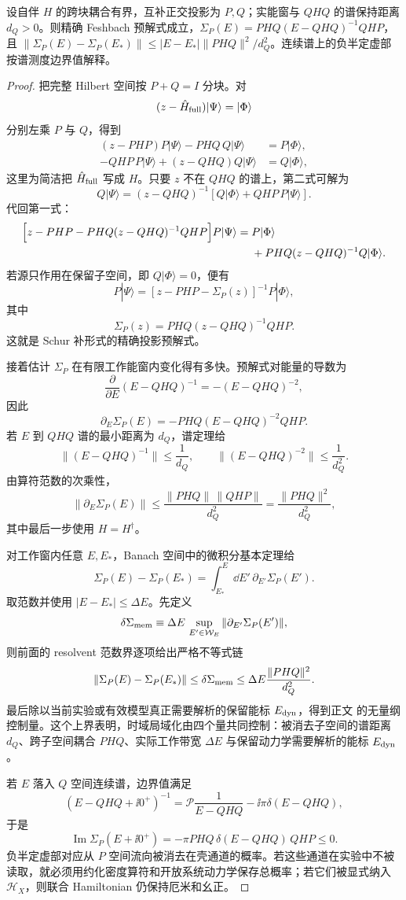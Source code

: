 \begin{theorem}[投影自能的谱隙变化界]
设自伴 $H$ 的跨块耦合有界，互补正交投影为 $P,Q$；实能窗与 $QHQ$ 的谱保持距离 $d_Q>0$。则精确 Feshbach 预解式成立，$\Sigma_P(E)=PHQ(E-QHQ)^{-1}QHP$，且 $\|\Sigma_P(E)-\Sigma_P(E_*)\|\le |E-E_*|\|PHQ\|^2/d_Q^2$。连续谱上的负半定虚部按谱测度边界值解释。
\end{theorem}
\begin{proof}
把完整 Hilbert 空间按 $P+Q=I$ 分块。对
\[
(z-\hat H_{\rm full})|\Psi\rangle=|\Phi\rangle
\]
分别左乘 $P$ 与 $Q$，得到
\begin{align*}
(z-PHP)P|\Psi\rangle-PHQ\,Q|\Psi\rangle
&=P|\Phi\rangle,\\
-QHP\,P|\Psi\rangle+(z-QHQ)Q|\Psi\rangle
&=Q|\Phi\rangle,
\end{align*}
这里为简洁把 $\hat H_{\rm full}$ 写成 $H$。只要 $z$ 不在 $QHQ$ 的谱上，第二式可解为
\[
Q|\Psi\rangle
=(z-QHQ)^{-1}
\left[
Q|\Phi\rangle+QHP\,P|\Psi\rangle
\right].
\]
代回第一式：
\begin{align*}
\Bigl[
z-PHP
-PHQ(z-QHQ)^{-1}QHP
\Bigr]P|\Psi\rangle
={}&P|\Phi\rangle\\
&+PHQ(z-QHQ)^{-1}Q|\Phi\rangle .
\end{align*}
若源只作用在保留子空间，即 $Q|\Phi\rangle=0$，便有
\[
P|\Psi\rangle
=
\left[
z-PHP-\Sigma_P(z)
\right]^{-1}P|\Phi\rangle,
\]
其中
\[
\Sigma_P(z)
=
PHQ(z-QHQ)^{-1}QHP.
\]
这就是 Schur 补形式的精确投影预解式。

接着估计 $\Sigma_P$ 在有限工作能窗内变化得有多快。预解式对能量的导数为
\[
\frac{\partial}{\partial E}
(E-QHQ)^{-1}
=
-(E-QHQ)^{-2},
\]
因此
\[
\partial_E\Sigma_P(E)
=
-PHQ(E-QHQ)^{-2}QHP.
\]
若 $E$ 到 $QHQ$ 谱的最小距离为 $d_Q$，谱定理给
\[
\|(E-QHQ)^{-1}\|
\le\frac1{d_Q},
\qquad
\|(E-QHQ)^{-2}\|
\le\frac1{d_Q^2}.
\]
由算符范数的次乘性，
\[
\|\partial_E\Sigma_P(E)\|
\le
\frac{\|PHQ\|\,\|QHP\|}{d_Q^2}
=
\frac{\|PHQ\|^2}{d_Q^2},
\]
其中最后一步使用 $H=H^\dagger$。

对工作窗内任意 $E,E_*$，Banach 空间中的微积分基本定理给
\[
\Sigma_P(E)-\Sigma_P(E_*)
=
\int_{E_*}^{E}\dd E'\,
\partial_{E'}\Sigma_P(E').
\]
取范数并使用 $|E-E_*|\le\Delta E$。先定义
\[
\delta\Sigma_{\rm mem}
\equiv
\Delta E\,
\sup_{E'\in\mathcal W_E}
\|\partial_{E'}\Sigma_P(E')\|,
\]
则前面的 resolvent 范数界逐项给出严格不等式链
\[
\|\Sigma_P(E)-\Sigma_P(E_*)\|
\le\delta\Sigma_{\rm mem}
\le
\Delta E\frac{\|PHQ\|^2}{d_Q^2}.
\]
最后除以当前实验或有效模型真正需要解析的保留能标 $E_{\rm dyn}$，得到正文 的无量纲控制量。这个上界表明，时域局域化由四个量共同控制：被消去子空间的谱距离 $d_Q$、跨子空间耦合 $PHQ$、实际工作带宽 $\Delta E$ 与保留动力学需要解析的能标 $E_{\rm dyn}$。

若 $E$ 落入 $Q$ 空间连续谱，边界值满足
\[
(E-QHQ+\ii0^+)^{-1}
=
\mathcal P\frac1{E-QHQ}
-\ii\pi\delta(E-QHQ),
\]
于是
\[
\operatorname{Im}\Sigma_P(E+\ii0^+)
=
-\pi
PHQ\,\delta(E-QHQ)\,QHP
\le0.
\]
负半定虚部对应从 $P$ 空间流向被消去在壳通道的概率。若这些通道在实验中不被读取，就必须用约化密度算符和开放系统动力学保存总概率；若它们被显式纳入 $\mathcal H_X$，则联合 Hamiltonian 仍保持厄米和幺正。
\end{proof}


